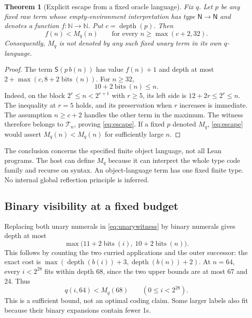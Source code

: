 \documentclass[11pt]{article}
\newtheorem{theorem}{Theorem}[section]
\theoremstyle{definition}
\newcommand{\N}{\mathbb N}
\newcommand{\tyN}{\mathsf N}
\newcommand{\depth}{\operatorname{depth}}
\newcommand{\bits}{\operatorname{bits}}
\newcommand{\Sc}{\mathsf S}
\begin{document}
\begin{theorem}[Explicit escape from a fixed oracle language]
\label{thm:escape}
Fix $q$. Let $p$ be any fixed raw term whose empty-environment interpretation
has type $\tyN\to\tyN$ and denotes a function $f:\N\to\N$. Put
$c=\depth(p)$. Then
\begin{equation}\label{eq:escape}
 f(n)<M_q(n)\qquad\text{for every }n\ge\max(c+2,32).
\end{equation}
Consequently, $M_q$ is not denoted by any such fixed unary term in its own
$q$-language.
\end{theorem}
\begin{proof}
The term $\Sc(p\,b(n))$ has value $f(n)+1$ and depth at most
$2+\max(c,8+2\bits(n))$. For $n\ge32$,
\[
 10+2\bits(n)\le n.
\]
Indeed, on the block $2^r\le n<2^{r+1}$ with $r\ge5$, its left side is
$12+2r\le2^r\le n$. The inequality at $r=5$ holds, and its preservation
when $r$ increases is immediate. The assumption $n\ge c+2$ handles the
other term in the maximum. The witness therefore belongs to
$\mathcal T_n$, proving \eqref{eq:escape}. If a fixed $p$ denoted $M_q$,
\eqref{eq:escape} would assert $M_q(n)<M_q(n)$ for sufficiently large $n$.
\end{proof}

The conclusion concerns the specified finite object language, not all Lean
programs. The host can define $M_q$ because it can interpret the whole type
code family and recurse on syntax. An object-language term has one fixed
finite type. No internal global reflection principle is inferred.

\subsection{Binary visibility at a fixed budget}

Replacing both unary numerals in \eqref{eq:unarywitness} by binary numerals
gives depth at most
\begin{equation}\label{eq:binarybudget}
 \max\bigl(11+2\bits(i),\ 10+2\bits(n)\bigr).
\end{equation}
This follows by counting the two curried applications and the outer
successor: the exact cost is
$\max(\depth(b(i))+3,\depth(b(n))+2)$.
At $n=64$, every $i<2^{28}$ fits within depth 68, since the two upper bounds
are at most 67 and 24. Thus
\begin{equation}\label{eq:binaryvisible}
 q(i,64)<M_q(68)\qquad(0\le i<2^{28}).
\end{equation}
This is a sufficient bound, not an optimal coding claim. Some larger labels
also fit because their binary expansions contain fewer 1s.
\end{document}
